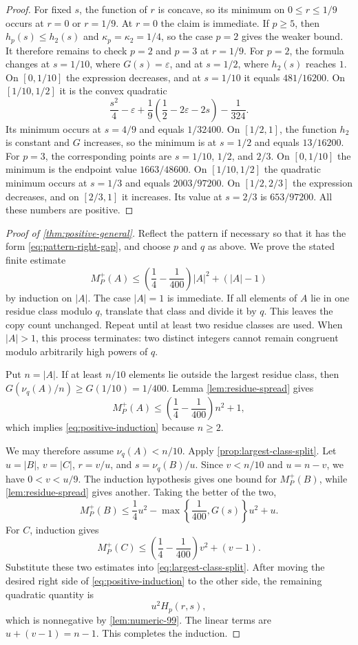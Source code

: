 \documentclass[11pt]{article}
\numberwithin{equation}{section}
\theoremstyle{remark}
\begin{document}
\begin{proof}
For fixed $s$, the function of $r$ is concave, so its minimum on
$0\le r\le1/9$ occurs at $r=0$ or $r=1/9$.  At $r=0$ the claim is
immediate.  If $p\ge5$, then $h_p(s)\le h_2(s)$ and
$\kappa_p=\kappa_2=1/4$, so the case $p=2$ gives the weaker bound.  It
therefore remains to check $p=2$ and $p=3$ at $r=1/9$.
For $p=2$, the formula changes at $s=1/10$, where
$G(s)=\varepsilon$, and at $s=1/2$, where $h_2(s)$ reaches $1$.
On $[0,1/10]$ the expression decreases, and at $s=1/10$ it equals
$481/16200$.  On $[1/10,1/2]$ it is the convex quadratic
\[
 \frac{s^2}{4}-\varepsilon
 +\frac19\left(\frac12-2\varepsilon-2s\right)-\frac1{324}.
\]
Its minimum occurs at $s=4/9$ and equals $1/32400$.  On
$[1/2,1]$, the function $h_2$ is constant and $G$ increases, so the
minimum is at $s=1/2$ and equals $13/16200$.
For $p=3$, the corresponding points are $s=1/10$, $1/2$, and $2/3$.
On $[0,1/10]$ the minimum is the endpoint value $1663/48600$.  On
$[1/10,1/2]$ the quadratic minimum occurs at $s=1/3$ and equals
$2003/97200$.  On $[1/2,2/3]$ the expression decreases, and on
$[2/3,1]$ it increases.  Its value at $s=2/3$ is
$653/97200$.  All these numbers are positive.
\end{proof}
\begin{proof}[Proof of \cref{thm:positive-general}]
Reflect the pattern if necessary so that it has the form
\eqref{eq:pattern-right-gap}, and choose $p$ and $q$ as above.  We prove the
stated finite estimate
\begin{equation}\label{eq:positive-induction}
 M_P^+(A)\le
 \left(\frac14-\frac1{400}\right)|A|^2+(|A|-1)
\end{equation}
by induction on $|A|$.
The case $|A|=1$ is immediate.  If all elements of $A$ lie in one residue
class modulo $q$, translate that class and divide it by $q$.  This leaves
the copy count unchanged.  Repeat until at least two residue classes are
used.  When $|A|>1$, this process terminates: two distinct integers cannot
remain congruent modulo arbitrarily high powers of $q$.

Put $n=|A|$.  If at least $n/10$ elements lie outside the largest residue
class, then $G(\nu_q(A)/n)\ge G(1/10)=1/400$.  Lemma
\ref{lem:residue-spread} gives
\[
 M_P^+(A)\le\left(\frac14-\frac1{400}\right)n^2+1,
\]
which implies \eqref{eq:positive-induction} because $n\ge2$.

We may therefore assume $\nu_q(A)<n/10$.  Apply
\cref{prop:largest-class-split}.  Let $u=|B|$, $v=|C|$,
$r=v/u$, and $s=\nu_q(B)/u$.  Since $v<n/10$ and $u=n-v$, we have
$0<v<u/9$.  The induction hypothesis gives one bound for $M_P^+(B)$, while
\cref{lem:residue-spread} gives another.  Taking the better of the two,
\[
 M_P^+(B)
 \le \frac14u^2-
 \max\left\{\frac1{400},G(s)\right\}u^2+u.
\]
For $C$, induction gives
\[
 M_P^+(C)
 \le\left(\frac14-\frac1{400}\right)v^2+(v-1).
\]
Substitute these two estimates into
\eqref{eq:largest-class-split}.  After moving the desired right side of
\eqref{eq:positive-induction} to the other side, the remaining quadratic
quantity is
\[
 u^2H_p(r,s),
\]
which is nonnegative by \cref{lem:numeric-99}.  The linear terms are
$u+(v-1)=n-1$.  This completes the induction.
\end{proof}
\end{document}
